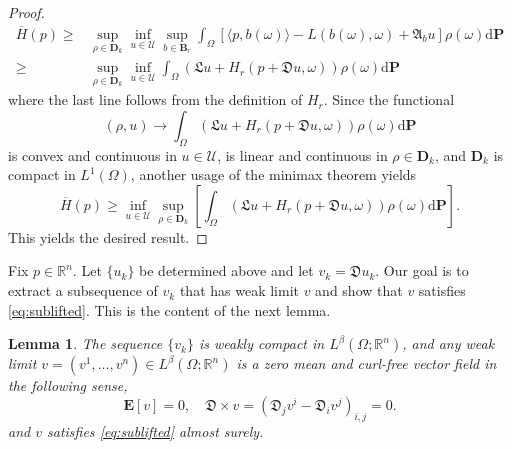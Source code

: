 \documentclass[11pt,reqno]{amsart}
\newtheorem{lem}[thm]{Lemma}
\theoremstyle{definition}
\theoremstyle{remark}
\numberwithin{equation}{section}
\newcommand{\R}{{\mathbb{R}}}
\begin{document}
\begin{proof}
\begin{align*}
    \overline{H}(p) \geq & \sup_{\rho \in \mathbf{D}_{k}}\inf_{u\in \mathscr{U}}\sup_{b\in\mathbf{B}_{r}} \int_{\Omega} [\langle p,b(\omega)\rangle - L(b(\omega),\omega) + \mathfrak{A}_{b}u]\rho(\omega) \mathrm{d}\mathbf{P} \\
 \geq & \sup_{\rho \in \mathbf{D}_{k}}\inf_{u\in \mathscr{U}} \int_{\Omega} (\mathfrak{L}u + H_{r}(p + \mathfrak{D} u, \omega))\rho(\omega) \mathrm{d}\mathbf{P}
\end{align*}
where the last line follows from the definition of $H_r$. 
Since the functional
\begin{equation*}
    (\rho, u) \rightarrow \int_{\Omega} (\mathfrak{L}u + H_{r}(p + \mathfrak{D} u, \omega))\rho(\omega) \mathrm{d}\mathbf{P}
\end{equation*}
is convex and continuous in $u\in \mathscr{U}$, is linear and continuous in $\rho \in \mathbf{D}_{k}$, and $\mathbf{D}_{k}$ is compact in $L^1(\Omega)$, another usage of the minimax theorem yields
\begin{equation*}
     \overline{H}(p) \geq \inf_{u\in \mathscr{U}}\sup_{\rho \in \mathbf{D}_{k}} \left[ \int_\Omega (\mathfrak{L}u + H_{r}(p + \mathfrak{D} u, \omega))\rho(\omega) \mathrm{d}\mathbf{P}\right].
\end{equation*}
This yields the desired result.
\end{proof}


Fix $p\in \R^n$. Let $\{u_k\}$ be determined above and let $v_k = \mathfrak{D}u_k$. Our goal is to extract a subsequence of $v_k$ that has weak limit $v$ and show that $v$ satisfies \eqref{eq:sublifted}. This is the content of the next lemma.

\begin{lem}\label{Gardv}
The sequence $\{v_{k}\}$ is weakly compact in $L^{\beta}(\Omega;\R^n)$, and any weak limit $v = (v^1,\dots,v^n) \in L^{\beta}(\Omega;\R^n)$ is a zero mean and curl-free vector field in the following sense,
$$
\mathbf{E}[v] = 0, \quad \mathfrak{D}\times v = \left(\mathfrak{D}_j v^i - \mathfrak{D}_i v^j\right)_{i,j} = 0.
$$
and $v$ satisfies \eqref{eq:sublifted} almost surely. 
\end{lem}
\end{document}
